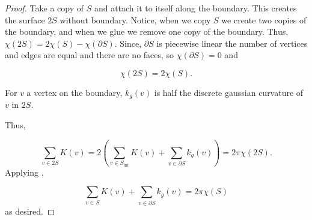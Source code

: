\begin{proof}
Take a copy of $S$ and attach it to itself along the boundary.
This creates the surface $2S$ without boundary. Notice,
when we copy $S$ we create two copies of the boundary, and when
we glue we remove one copy of the boundary.
Thus, $\chi(2S)=2\chi(S)-\chi(\partial S).$
Since, $\partial S$ is piecewise linear the number of vertices and
edges are equal and there are no faces, so $\chi(\partial S)=0$
and 

\begin{equation} \label{eqn:glue}
\chi(2S)=2\chi(S).
\end{equation}

For $v$ a vertex on the boundary, $k_g(v)$ is half
the discrete gaussian curvature of $v$ in $2S.$

Thus,

$$\sum_{v\in 2S}K(v)=2\left(\sum_{v\in S_{\text{int}}}K(v)+\sum_{v\in \partial S} k_g(v)\right) =2\pi  \chi(2S).$$
Applying ,

$$\sum_{v\in S}K(v)+\sum_{v\in \partial S} k_g(v)=2\pi  \chi(S)$$
as desired.

\end{proof}
